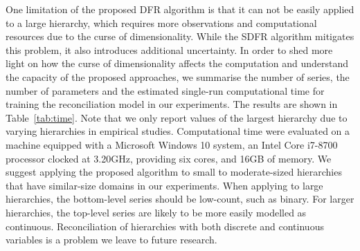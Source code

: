\documentclass[a4paper,review,12pt,authoryear]{elsarticle}
\theoremstyle{definition}
\begin{document}
     One limitation of the proposed DFR algorithm is that it can not be easily applied to a large hierarchy, which requires more observations and computational resources due to the curse of dimensionality.
     While the SDFR algorithm mitigates this problem, it also introduces additional uncertainty.
     In order to shed more light on how the curse of dimensionality affects the computation and understand the capacity of the proposed approaches, we summarise the number of series, the number of parameters and the estimated single-run computational time for training the reconciliation model in our experiments. 
     The results are shown in Table~\ref{tab:time}. 
     Note that we only report values of the largest hierarchy due to varying hierarchies in empirical studies. 
     Computational time were evaluated on a machine equipped with a Microsoft Windows 10 system, an Intel Core i7-8700 processor clocked at 3.20GHz, providing six cores, and 16GB of memory.
     We suggest applying the proposed algorithm to small to moderate-sized hierarchies that have similar-size domains in our experiments. When applying to large hierarchies, the bottom-level series should be low-count, such as binary. For larger hierarchies, the top-level series are likely to be more easily modelled as continuous. Reconciliation of hierarchies with both discrete and continuous variables is a problem we leave to future research.

     \begin{table}
       \centering
       \caption{\label{tab:time} Reconciliation model size and computational time (in seconds) in the four experiments implemented in different sections.}
     \end{table}
\end{document}
